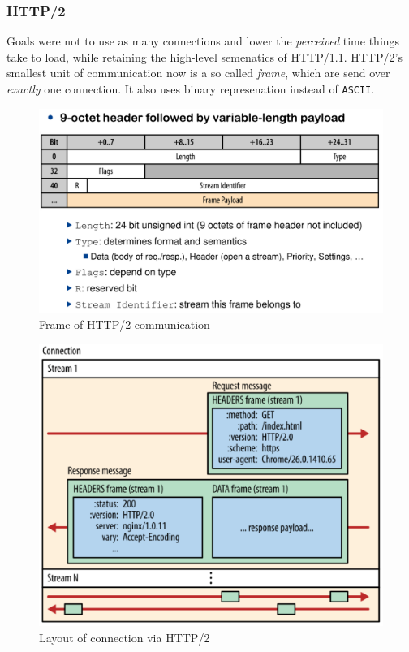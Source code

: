 \documentclass[english]{panikzettel}
\begin{document}
	\subsubsection{HTTP/2}
	\label{sss-http-2}
	
	Goals were not to use as many connections and lower the \textit{perceived} time things take to load, while retaining the high-level semenatics of HTTP/1.1.
	HTTP/2's smallest unit of communication now is a so called \textit{frame}, which are send over \textit{exactly} one connection.
	It also uses binary represenation instead of \texttt{ASCII}.

	\begin{halfboxl}
		\begin{figure}[H]
			\centering
			\includegraphics[width=\textwidth]{img/2-http2-frame.png}
			\caption{Frame of HTTP/2 communication}
			\label{img-2-http2-frame}
		\end{figure}
	\end{halfboxl}%
	\begin{halfboxr}
		\begin{figure}[H]
			\centering
			\includegraphics[width=\textwidth]{img/2-http2-conn.png}
			\caption{Layout of connection via HTTP/2}
			\label{img-2-http2-conn}
		\end{figure}
	\end{halfboxr}
	
\end{document}

